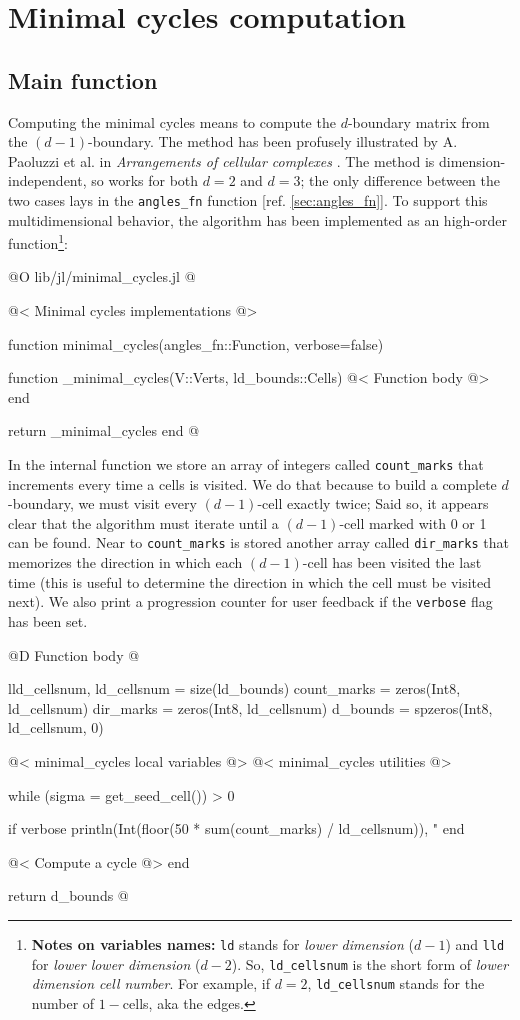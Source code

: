 \chapter{Minimal cycles computation}
\label{ch:minimal_cycles}

\section{Main function}


Computing the minimal cycles means to compute the $d$-boundary matrix
from the $(d-1)$-boundary. The method has been profusely illustrated
by A. Paoluzzi et al. in \textit{Arrangements of cellular complexes}
\cite{Paoluzzi}.
The method is dimension-independent, so works for both $d=2$ and $d=3$;
the only difference between the two cases lays in the \texttt{angles\_fn}
function [ref. \ref{sec:angles_fn}]. To support this multidimensional
behavior, the algorithm has been implemented as an high-order function\footnote{
    \textbf{Notes on variables names:} \texttt{ld} stands for \textit{lower dimension} ($d-1$)
    and \texttt{lld} for \textit{lower lower dimension} ($d-2$). So, \texttt{ld\_cellsnum} is the
    short form of \textit{lower dimension cell number}. For example, if $d=2$, \texttt{ld\_cellsnum} stands for the
    number of $1-$cells, aka the edges.
}:

@O lib/jl/minimal_cycles.jl
@{@< Minimal cycles implementations @>

function minimal_cycles(angles_fn::Function, verbose=false)

    function _minimal_cycles(V::Verts, ld_bounds::Cells)
        @< Function body @>
    end

    return _minimal_cycles
end
@}

In the internal function we store an array of integers called \texttt{count\_marks} 
that increments every time a cells is visited. We do that because to build 
a complete $d$-boundary, we must visit every $(d-1)$-cell exactly twice;
Said so, it appears clear that the algorithm must iterate until a $(d-1)$-cell 
marked with 0 or 1 can be found. Near to \texttt{count\_marks} is stored another
array called \texttt{dir\_marks} that memorizes the direction in which each $(d-1)$-cell
has been visited the last time (this is useful to determine the direction in which the cell
must be visited next). We also print a progression counter for user feedback 
if the \texttt{verbose} flag has been set.

@D Function body
@{lld_cellsnum, ld_cellsnum = size(ld_bounds)
count_marks = zeros(Int8, ld_cellsnum)
dir_marks = zeros(Int8, ld_cellsnum)
d_bounds = spzeros(Int8, ld_cellsnum, 0)

@< minimal\_cycles local variables @>
@< minimal\_cycles utilities @>

while (sigma = get_seed_cell()) > 0

    if verbose
        println(Int(floor(50 * sum(count_marks) / ld_cellsnum)), "%
    end

    @< Compute a cycle @>
end

return d_bounds
@}

